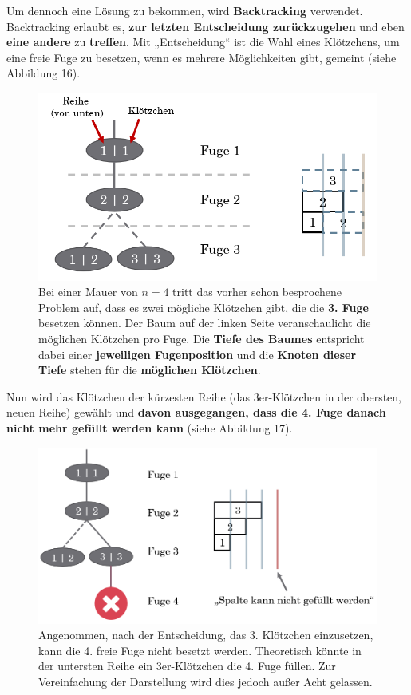 \documentclass[a4paper,12pt]{article}
\begin{document}
Um dennoch eine Lösung zu bekommen, wird \textbf{Backtracking} verwendet. Backtracking erlaubt es, \textbf{zur letzten Entscheidung zurückzugehen} und eben \textbf{eine andere} zu \textbf{treffen}. Mit „Entscheidung“ ist die Wahl eines Klötzchens, um eine freie Fuge zu besetzen, wenn es mehrere Möglichkeiten gibt, gemeint (siehe Abbildung 16).
\begin{figure}[H]
    \centering
    \includegraphics[width=1\linewidth]{Bilder/Aufgabe1/Backtracking_01.png}
    \caption{Bei einer Mauer von $n = 4$ tritt das vorher schon besprochene Problem auf, dass es zwei mögliche Klötzchen gibt, die die \textbf{3. Fuge} besetzen können. Der Baum auf der linken Seite veranschaulicht die möglichen Klötzchen pro Fuge. Die \textbf{Tiefe des Baumes} entspricht dabei einer \textbf{jeweiligen Fugenposition} und die \textbf{Knoten dieser Tiefe} stehen für die \textbf{möglichen Klötzchen}.}
\end{figure}
Nun wird das Klötzchen der kürzesten Reihe (das 3er-Klötzchen in der obersten, neuen Reihe) gewählt und \textbf{davon ausgegangen, dass die 4. Fuge danach nicht mehr gefüllt werden kann} (siehe Abbildung 17).
\begin{figure}[H]
    \centering
    \includegraphics[width=1\linewidth]{Bilder/Aufgabe1/Backtracking_02.png}
    \caption{Angenommen, nach der Entscheidung, das 3. Klötzchen einzusetzen, kann die 4. freie Fuge nicht besetzt werden. Theoretisch könnte in der untersten Reihe ein 3er-Klötzchen die 4. Fuge füllen. Zur Vereinfachung der Darstellung wird dies jedoch außer Acht gelassen.}
\end{figure}
\end{document}
